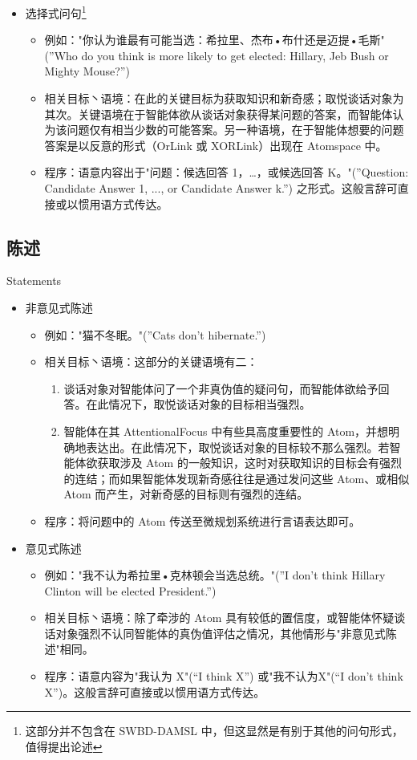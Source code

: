 \begin{itemize}
\item 选择式问句\footnote{这部分并不包含在 SWBD-DAMSL 中，但这显然是有别于其他的问句形式，值得提出论述}
\begin{itemize}
\item 例如："你认为谁最有可能当选：希拉里、杰布•布什还是迈提•毛斯"(”Who do you think is more likely to get elected: Hillary, Jeb Bush or Mighty Mouse?”)
\item 相关目标丶语境：在此的关键目标为获取知识和新奇感；取悦谈话对象为其次。关键语境在于智能体欲从谈话对象获得某问题的答案，而智能体认为该问题仅有相当少数的可能答案。另一种语境，在于智能体想要的问题答案是以反意的形式（OrLink 或 XORLink）出现在 Atomspace 中。
\item 程序：语意内容出于"问题：候选回答 1，…，或候选回答 K。"(”Question: Candidate Answer 1, ..., or Candidate Answer k.”) 之形式。这般言辞可直接或以惯用语方式传达。
\end{itemize}


\end{itemize}


\subsection{陈述}{Statements}

\begin{itemize}
\item 非意见式陈述
\begin{itemize}
\item 例如："猫不冬眠。"(”Cats don’t hibernate.”)
\item 相关目标丶语境：这部分的关键语境有二：
\begin{enumerate}
\item 谈话对象对智能体问了一个非真伪值的疑问句，而智能体欲给予回答。在此情况下，取悦谈话对象的目标相当强烈。
\item 智能体在其 AttentionalFocus 中有些具高度重要性的 Atom，并想明确地表达出。在此情况下，取悦谈话对象的目标较不那么强烈。若智能体欲获取涉及 Atom 的一般知识，这时对获取知识的目标会有强烈的连结；而如果智能体发现新奇感往往是通过发问这些 Atom、或相似 Atom 而产生，对新奇感的目标则有强烈的连结。
\end{enumerate}
\item 程序：将问题中的 Atom 传送至微规划系统进行言语表达即可。
\end{itemize}


\item 意见式陈述
\begin{itemize}
\item 例如："我不认为希拉里•克林顿会当选总统。"(”I don’t think Hillary Clinton will be elected President.”) 
\item 相关目标丶语境：除了牵涉的 Atom 具有较低的置信度，或智能体怀疑谈话对象强烈不认同智能体的真伪值评估之情况，其他情形与"非意见式陈述"相同。
\item 程序：语意内容为"我认为 X"(“I think X”) 或"我不认为X"(“I don’t think X”)。这般言辞可直接或以惯用语方式传达。
\end{itemize}

\end{itemize}

